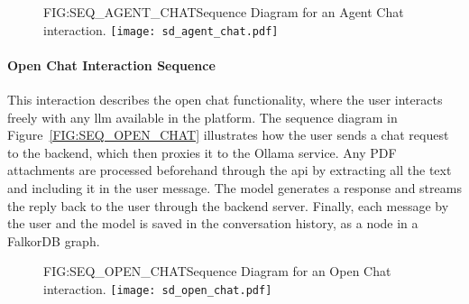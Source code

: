 \begin{figure}[Sequence Diagram for Agent Chat]{FIG:SEQ_AGENT_CHAT}{Sequence Diagram for an Agent Chat interaction.}
    \texttt{[image: sd\_agent\_chat.pdf]}
\end{figure}

\paragraph{Open Chat Interaction Sequence}
This interaction describes the open chat functionality, where the user interacts freely with any \ac{llm} available in the platform. The sequence diagram in Figure~\ref{FIG:SEQ_OPEN_CHAT} illustrates how the user sends a chat request to the backend, which then proxies it to the Ollama service. Any PDF attachments are processed beforehand through the \acs{api} by extracting all the text and including it in the user message. The model generates a response and streams the reply back to the user through the backend server. Finally, each message by the user and the model is saved in the conversation history, as a node in a FalkorDB graph.

\begin{figure}[Sequence Diagram for Open Chat]{FIG:SEQ_OPEN_CHAT}{Sequence Diagram for an Open Chat interaction.}
    \texttt{[image: sd\_open\_chat.pdf]}
\end{figure}

\newpage